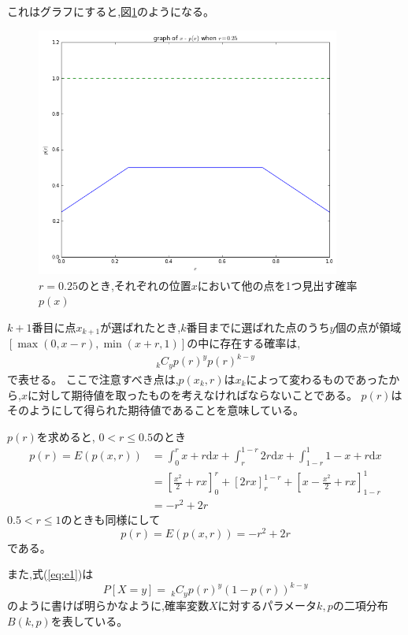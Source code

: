 これはグラフにすると,図\ref{fig:f3}のようになる。
\begin{figure}[H]
    \begin{center}
        \includegraphics[width=10cm]{../img/fig3.png}
        \caption{$r=0.25$のとき,それぞれの位置$x$において他の点を1つ見出す確率$p(x)$}
        \label{fig:f3}
    \end{center}
\end{figure}

$k+1$番目に点$x_{k+1}$が選ばれたとき,$k$番目までに選ばれた点のうち$y$個の点が領域$[\max(0,x-r), \min(x+r,1)]$の中に存在する確率は,
\begin{eqnarray}
_{k}C_{y}p(r)^{y}p(r)^{k-y}
\label{eq:e1}
\end{eqnarray}
で表せる。
ここで注意すべき点は,$p(x_{k}, r)$は$x_{k}$によって変わるものであったから,$x$に対して期待値を取ったものを考えなければならないことである。
$p(r)$はそのようにして得られた期待値であることを意味している。

$p(r)$を求めると,
$0<r\le0.5$のとき
\begin{align}p(r) = E(p(x, r)) &= \int^{r}_{0}x+r\mathrm{d}x + \int^{1-r}_{r}2r \mathrm{d}x + \int^{1}_{1-r} 1-x+r \mathrm{d}x\nonumber \\
&= \left[\frac{x^{2}}{2} + rx \right]^{r}_{0} + \left[ 2rx\right]^{1-r}_{r}+ \left[ x-\frac{x^{2}}{2} + rx\right]^{1}_{1-r}\nonumber \\
&= -r^{2} + 2r \end{align}
$0.5<r\le1$のときも同様にして
\[p(r) = E(p(x,r)) = -r^{2} + 2r\]
である。

また,式(\ref{eq:e1})は
\[P[X=y] =\ _{k}C_{y}p(r)^{y}(1-p(r))^{k-y}\]
のように書けば明らかなように,確率変数$X$に対するパラメータ$k,p$の二項分布$B(k,p)$を表している。

